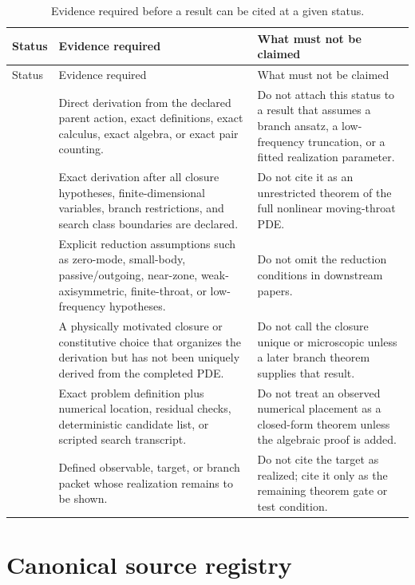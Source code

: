 \begin{longtable}{@{}L{0.18\textwidth}L{0.32\textwidth}L{0.38\textwidth}@{}}
\caption{Evidence required before a result can be cited at a given status.}\label{tab:claim-status-evidence}\\
\toprule
Status & Evidence required & What must not be claimed \\
\midrule
\endfirsthead
\toprule
Status & Evidence required & What must not be claimed \\
\midrule
\endhead
\StatusExact{} & Direct derivation from the declared parent action, exact definitions, exact calculus, exact algebra, or exact pair counting. & Do not attach this status to a result that assumes a branch ansatz, a low-frequency truncation, or a fitted realization parameter. \\
\addlinespace
\StatusExactClosure{} & Exact derivation after all closure hypotheses, finite-dimensional variables, branch restrictions, and search class boundaries are declared. & Do not cite it as an unrestricted theorem of the full nonlinear moving-throat PDE. \\
\addlinespace
\StatusReduced{} & Explicit reduction assumptions such as zero-mode, small-body, passive/outgoing, near-zone, weak-axisymmetric, finite-throat, or low-frequency hypotheses. & Do not omit the reduction conditions in downstream papers. \\
\addlinespace
\StatusEffective{} & A physically motivated closure or constitutive choice that organizes the derivation but has not been uniquely derived from the completed PDE. & Do not call the closure unique or microscopic unless a later branch theorem supplies that result. \\
\addlinespace
\StatusNumerical{} & Exact problem definition plus numerical location, residual checks, deterministic candidate list, or scripted search transcript. & Do not treat an observed numerical placement as a closed-form theorem unless the algebraic proof is added. \\
\addlinespace
\StatusOpen{} & Defined observable, target, or branch packet whose realization remains to be shown. & Do not cite the target as realized; cite it only as the remaining theorem gate or test condition. \\
\bottomrule
\end{longtable}

\section{Canonical source registry}
\label{sec:canonical-source-registry}


